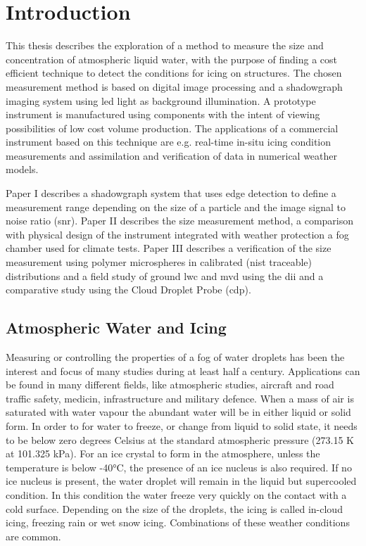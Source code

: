 

\chapter{Introduction}

This thesis describes the exploration of a method to measure the size and concentration of atmospheric liquid water, with the purpose of finding a cost efficient technique to detect the conditions for icing on structures. The chosen measurement method is based on digital image processing and a shadowgraph imaging system using \gls{led} light as background illumination. A prototype instrument is manufactured using components with the intent of viewing possibilities of low cost volume production. The applications of a commercial instrument based on this technique are e.g. real-time in-situ icing condition measurements and assimilation and verification of data in numerical weather models. 

Paper I describes a shadowgraph system that uses edge detection to define a measurement range depending on the size of a particle and the image signal to noise ratio (\gls{snr}). Paper II describes the size measurement method, a comparison with  physical design of the instrument integrated with weather protection a fog chamber used for climate tests. Paper III describes a verification of the size measurement using polymer microspheres in calibrated (\gls{nist} traceable) distributions and a field study of ground \gls{lwc} and \gls{mvd} using the \gls{dii} and a comparative study using the Cloud Droplet Probe (\gls{cdp}).

\section{Atmospheric Water and Icing}

Measuring or controlling the properties of a fog of water droplets has been the interest and focus of many studies during at least half a century. Applications can be found in many different fields, like atmospheric studies, aircraft and road traffic safety, medicin, infrastructure and military defence. When a mass of air is saturated with water vapour the abundant water will be in either liquid or solid form. In order to for water to freeze, or change from liquid to solid state, it needs to be below zero degrees Celsius at the standard atmospheric pressure (273.15 K at 101.325 kPa). For an ice crystal to form in the atmosphere, unless the temperature is below -40°C, the presence of an ice nucleus is also required. If no ice nucleus is present, the water droplet will remain in the liquid but supercooled condition. In this condition the water freeze very quickly on the contact with a cold surface. Depending on the size of the droplets, the icing is called in-cloud icing, freezing rain or wet snow icing. Combinations of these weather conditions are common.

